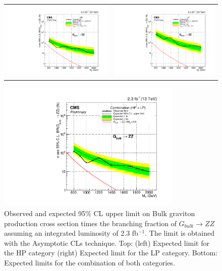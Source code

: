 \begin{figure}[!ht]
\caption{ Observed and expected 95$\%$ CL upper limit on Bulk graviton production cross section times the branching fraction of $G_{bulk} \rightarrow  ZZ$ assuming an integrated luminosity of 2.3 fb$^{-1}$. The limit is obtained with the Asymptotic CLs technique. Top: (left) Expected limit for the HP category (right) Expected limit for the LP category. Bottom: Expected limits for the combination of both categories.}
\label{fig:limits1}
\begin{tabular}{cc}
  \includegraphics[width=200pt]{figuresARC/limits/limitBulkGHP.pdf} &
  \includegraphics[width=200pt]{figuresARC/limits/limitBulkGLP.pdf}\\
\end{tabular}
\begin{center}
  \includegraphics[width=250pt]{figuresARC/limits/limitBulkGNP.pdf}
\end{center}
\end{figure}

